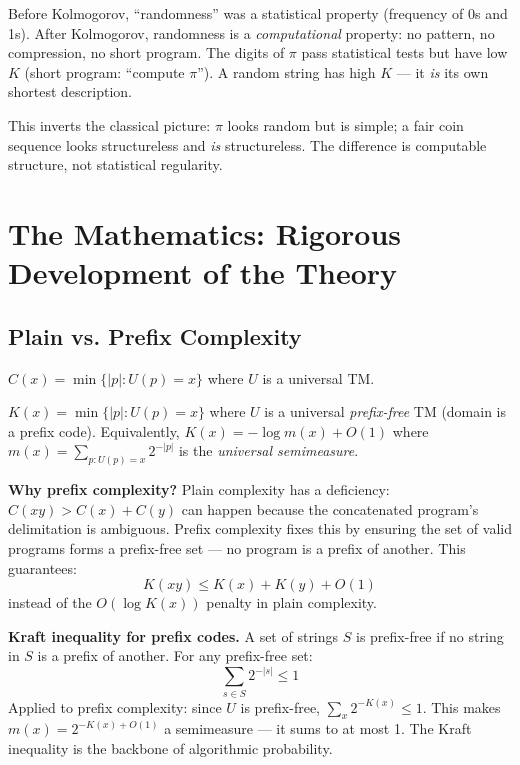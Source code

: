 Before Kolmogorov, ``randomness'' was a statistical property (frequency of 0s and 1s). After Kolmogorov, randomness is a \emph{computational} property: no pattern, no compression, no short program. The digits of $\pi$ pass statistical tests but have low $K$ (short program: ``compute $\pi$''). A random string has high $K$ --- it \emph{is} its own shortest description.

This inverts the classical picture: $\pi$ looks random but is simple; a fair coin sequence looks structureless and \emph{is} structureless. The difference is computable structure, not statistical regularity.

\section{The Mathematics: Rigorous Development of the Theory}
\label{sec:kolmogorov:math}

\subsection{Plain vs. Prefix Complexity}
\label{sec:kolmogorov:plain_prefix}

\begin{definition}
$C(x) = \min \{ |p| : U(p) = x \}$ where $U$ is a universal TM.
\end{definition}

\begin{definition}
$K(x) = \min \{ |p| : U(p) = x \}$ where $U$ is a universal \emph{prefix-free} TM (domain is a prefix code). Equivalently, $K(x) = -\log m(x) + O(1)$ where $m(x) = \sum_{p: U(p)=x} 2^{-|p|}$ is the \emph{universal semimeasure}.
\end{definition}

\textbf{Why prefix complexity?} Plain complexity has a deficiency: $C(xy) > C(x) + C(y)$ can happen because the concatenated program's delimitation is ambiguous. Prefix complexity fixes this by ensuring the set of valid programs forms a prefix-free set --- no program is a prefix of another. This guarantees:
\[
K(xy) \le K(x) + K(y) + O(1)
\]
instead of the $O(\log K(x))$ penalty in plain complexity.

\textbf{Kraft inequality for prefix codes.} A set of strings $S$ is prefix-free if no string in $S$ is a prefix of another. For any prefix-free set:
\[
\sum_{s \in S} 2^{-|s|} \le 1
\]
Applied to prefix complexity: since $U$ is prefix-free, $\sum_x 2^{-K(x)} \le 1$. This makes $m(x) = 2^{-K(x)+O(1)}$ a semimeasure --- it sums to at most 1. The Kraft inequality is the backbone of algorithmic probability.

